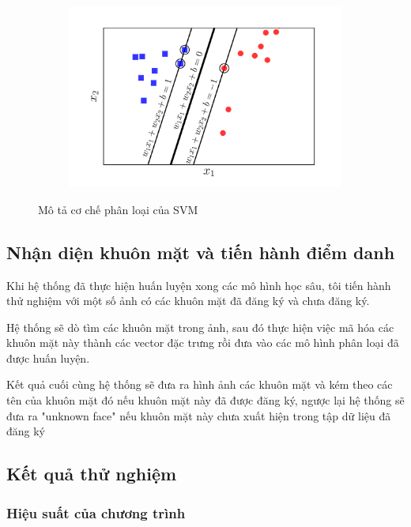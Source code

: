 \begin{figure}
    \begin{subfigure}{1\textwidth}
        \includegraphics[width=1\linewidth]{Chapters/items/svm3.jpg}
        \label{fig:svm}
    \end{subfigure}
    \caption{Mô tả cơ chế phân loại của SVM}
\end{figure}


\subsection{Nhận diện khuôn mặt và tiến hành điểm danh}
Khi hệ thống đã thực hiện huấn luyện xong các mô hình học sâu, tôi tiến hành thử nghiệm với một số ảnh có các khuôn mặt đã
đăng ký và chưa đăng ký.

Hệ thống sẽ dò tìm các khuôn mặt trong ảnh, sau đó thực hiện việc mã hóa các khuôn mặt này thành các vector đặc trưng
rồi đưa vào các mô hình phân loại đã được huấn luyện.

Kết quả cuối cùng hệ thống sẽ đưa ra hình ảnh các khuôn mặt và kém theo các tên của khuôn mặt đó
nếu khuôn mặt này đã được đăng ký, ngược lại hệ thống sẽ đưa ra "unknown face" nếu khuôn mặt này
chưa xuất hiện trong tập dữ liệu đã đăng ký

\subsection{Kết quả thử nghiệm}
\subsubsection{Hiệu suất của chương trình}


